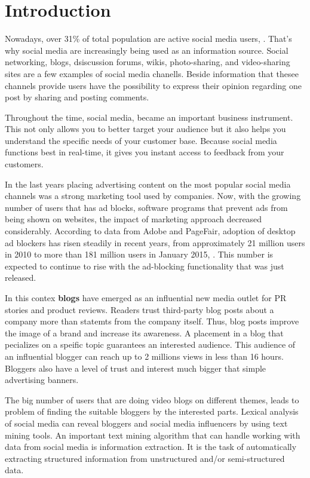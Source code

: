 \section*{Introduction}

\setcounter{page}{13}

Nowadays, over 31\% of total population are active social media users, \cite{SMResearch}. That's why social media are increasingly being used as an information source. Social networking, blogs, dsiscussion forums, wikis, photo-sharing, and video-sharing sites are a few examples of social media chanells. Beside information that thesee channels provide users have the possibility to express their opinion regarding one post by sharing and posting comments.

Throughout the time, social media, became an important business instrument. This not only allows you to better target your audience but it also helps you understand the specific needs of your customer base. Because social media functions best in real-time, it gives you instant access to feedback from your customers. 

In the last years placing advertising content on the most popular social media channels was a strong marketing tool used by companies. Now, with the growing number of users that has ad blocks, software programs that prevent ads from being shown on websites, the impact of marketing approach decreased considerably. According to data from Adobe and PageFair, adoption of desktop ad blockers has risen steadily in recent years, from approximately 21 million users in 2010 to more than 181 million users in January 2015, \cite{pagefair}. This number is expected to continue to rise with the ad-blocking functionality that was just released. 

In this contex \textbf{blogs} have emerged as an influential new media outlet for PR stories and product reviews. Readers trust third-party blog posts about a company more than statemts from the company itself. Thus, blog posts improve the image of a brand and increase its awareness. A placement in a blog that pecializes on a speific topic guarantees an interested audience. This audience of an influential blogger can reach up to 2 millions views in less than 16 hours. Bloggers also have a level of trust and interest much bigger that simple advertising banners. 

The big number of users that are doing video blogs on different themes, leads to problem of finding the suitable bloggers by the interested parts. Lexical analysis of social media can reveal bloggers and social media influencers by using text mining tools. An important text mining algorithm that can handle working with data from social media is information extraction. It is the task of automatically extracting structured information from unstructured and/or semi-structured data.

